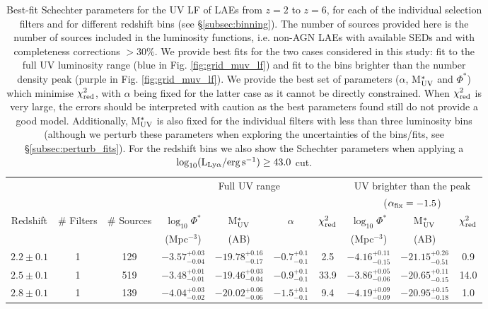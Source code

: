 \documentclass[a4paper,fleqn,usenatbib]{mnras}
\begin{document}
\begin{table*}
\setlength{\tabcolsep}{5pt}
\caption{Best-fit Schechter parameters for the UV LF of LAEs from $z=2$ to $z=6$, for each of the individual selection filters and for different redshift bins (see \S\ref{subsec:binning}). The number of sources provided here is the number of sources included in the luminosity functions, i.e. non-AGN LAEs with available SEDs and with completeness corrections $>30\%$. We provide best fits for the two cases considered in this study: fit to the full UV luminosity range (blue in Fig. \ref{fig:grid_muv_lf}) and fit to the bins brighter than the number density peak (purple in Fig. \ref{fig:grid_muv_lf}). We provide the best set of parameters ($\alpha$, M$_{\rm UV}^*$ and $\Phi^*$) which minimise $\chi^2_{\rm red}$, with $\alpha$ being fixed for the latter case as it cannot be directly constrained. When $\chi^2_{\rm red}$ is very large, the errors should be interpreted with caution as the best parameters found still do not provide a good model. Additionally, M$_{\rm UV}^*$ is also fixed for the individual filters with less than three luminosity bins (although we perturb these parameters when exploring the uncertainties of the bins/fits, see \S\ref{subsec:perturb_fits}). For the redshift bins we also show the Schechter parameters when applying a $\log_{10} (\rm L_{Ly\alpha}/erg\,s^{-1}) \geq 43.0$ cut.} \label{tab:schechter_params_uv_lf}
\begin{tabular}{ccc | cccc | ccc}
\hline
  & & & \multicolumn{4}{c}{Full UV range}|  & \multicolumn{3}{c}{UV brighter than the peak}\\ 
   & & & \multicolumn{4}{c}{}  & \multicolumn{3}{c}{($\alpha_{\rm fix}=-1.5$)}\\
\hline
Redshift & \# Filters & \# Sources & $\log_{10}\Phi^*$ & M$_{\rm UV}^*$ & $\alpha$ & $\chi^2_{\rm red}$ & $\log_{10}\Phi^*$ & M$_{\rm UV}^*$ & $\chi^2_{\rm red}$\\
&  &  & (Mpc$^{-3}$) & (AB) & & &(Mpc$^{-3}$)&(AB)& \\
\hline
$2.2\pm0.1$ & 1 & 129 & $-3.57^{+0.03}_{-0.04}$ & $-19.78^{+0.16}_{-0.17}$ & $-0.7^{+0.1}_{-0.1}$ & 2.5 & $-4.16^{+0.11}_{-0.15}$ & $-21.15^{+0.26}_{-0.51}$ & 0.9 \\
$2.5\pm0.1$ & 1 & 519 & $-3.48^{+0.01}_{-0.01}$ & $-19.46^{+0.03}_{-0.04}$ & $-0.9^{+0.1}_{-0.1}$ & 33.9 & $-3.86^{+0.05}_{-0.06}$ & $-20.65^{+0.11}_{-0.15}$ & 14.0 \\
$2.8\pm0.1$ & 1 & 139 & $-4.04^{+0.03}_{-0.02}$ & $-20.02^{+0.06}_{-0.06}$ & $-1.5^{+0.1}_{-0.1}$ & 9.4 & $-4.19^{+0.09}_{-0.09}$ & $-20.95^{+0.15}_{-0.18}$ & 1.0 \\

\end{tabular}
\end{table*}
\end{document}
